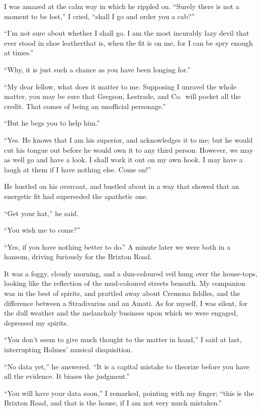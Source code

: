\documentclass[12pt,english]{book}
\begin{document}
I was amazed at the calm way in which he rippled on. {}``Surely there
is not a moment to be lost,'' I cried, {}``shall I go and order
you a cab?''

{}``I'm not sure about whether I shall go. I am the most incurably
lazy devil that ever stood in shoe leather\mdsh{---}that is, when
the fit is on me, for I can be spry enough at times.''

{}``Why, it is just such a chance as you have been longing for.''

{}``My dear fellow, what does it matter to me. Supposing I unravel
the whole matter, you may be sure that Gregson, Lestrade, and Co.\ will
pocket all the credit. That comes of being an unofficial personage.''

{}``But he begs you to help him.''

{}``Yes. He knows that I am his superior, and acknowledges it to
me; but he would cut his tongue out before he would own it to any
third person. However, we may as well go and have a look. I shall
work it out on my own hook. I may have a laugh at them if I have nothing
else. Come on!''

He hustled on his overcoat, and bustled about in a way that showed
that an energetic fit had superseded the apathetic one.

{}``Get your hat,'' he said.

{}``You wish me to come?''

{}``Yes, if you have nothing better to do.'' A minute later we were
both in a hansom, driving furiously for the Brixton Road.

It was a foggy, cloudy morning, and a dun-coloured veil hung over
the house-tops, looking like the reflection of the mud-coloured streets
beneath. My companion was in the best of spirits, and prattled away
about Cremona fiddles, and the difference between a Stradivarius and
an Amati. As for myself, I was silent, for the dull weather and the
melancholy business upon which we were engaged, depressed my spirits.

{}``You don't seem to give much thought to the matter in hand,''
I said at last, interrupting Holmes' musical disquisition.

{}``No data yet,'' he answered. {}``It is a capital mistake to
theorize before you have all the evidence. It biases the judgment.''

{}``You will have your data soon,'' I remarked, pointing with my
finger; {}``this is the Brixton Road, and that is the house, if I
am not very much mistaken.''
\end{document}
